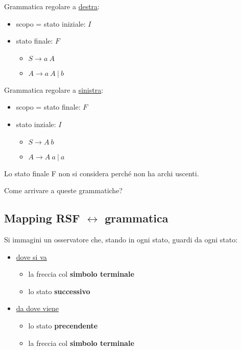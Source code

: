 \begin{multicols}{2}
Grammatica regolare a \underline{destra}:
\begin{itemize}
    \item scopo = stato iniziale: $I$
    \item stato finale: $F$
    \begin{itemize}
        \item $S \rightarrow a\ A$
        \item $A \rightarrow a\ A\ |\ b$
    \end{itemize}
\end{itemize}
Grammatica regolare a \underline{sinistra}:
\begin{itemize}
    \item scopo = stato finale: $F$
    \item stato inziale: $I$
    \begin{itemize}
        \item $S \rightarrow A\ b$
        \item $A \rightarrow A\ a\ |\ a$
    \end{itemize}
\end{itemize}
\end{multicols}

Lo stato finale F non si considera perché non ha archi uscenti.

Come arrivare a queste grammatiche?

\subsection{Mapping RSF $\longleftrightarrow$ grammatica}

Si immagini un osservatore che, stando in ogni stato, guardi da ogni stato:

\begin{multicols}{2}
    \begin{itemize}
        \item \underline{dove si va}
        \begin{itemize}
            \item la freccia col \textbf{simbolo terminale}
            \item lo stato \textbf{successivo}
        \end{itemize}
        \item \underline{da dove viene}
        \begin{itemize}
            \item lo stato \textbf{precendente}
            \item la freccia col \textbf{simbolo terminale}
        \end{itemize}
    \end{itemize}
\end{multicols}

